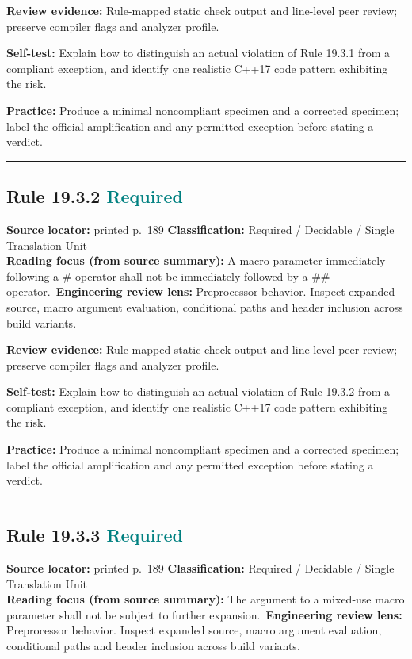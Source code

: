 \documentclass[10pt,letterpaper]{article}
\begin{document}
\textbf{Review evidence:} Rule-mapped static check output and line-level peer review; preserve compiler flags and analyzer profile.

\textbf{Self-test:} Explain how to distinguish an actual violation of Rule 19.3.1 from a compliant exception, and identify one realistic C++17 code pattern exhibiting the risk.\par
\textbf{Practice:} Produce a minimal noncompliant specimen and a corrected specimen; label the official amplification and any permitted exception before stating a verdict.
\smallskip\hrule\smallskip
\subsection*{Rule 19.3.2 \enspace \texorpdfstring{\small\textcolor{teal}{Required}}{Required}}
\noindent\textbf{Source locator:} printed p.~189 \quad\textbf{Classification:} Required / Decidable / Single Translation Unit\\
\textbf{Reading focus (from source summary):} A macro parameter immediately following a \# operator shall not be immediately followed by a \#\# operator.\
\textbf{Engineering review lens:} Preprocessor behavior. Inspect expanded source, macro argument evaluation, conditional paths and header inclusion across build variants.

\textbf{Review evidence:} Rule-mapped static check output and line-level peer review; preserve compiler flags and analyzer profile.

\textbf{Self-test:} Explain how to distinguish an actual violation of Rule 19.3.2 from a compliant exception, and identify one realistic C++17 code pattern exhibiting the risk.\par
\textbf{Practice:} Produce a minimal noncompliant specimen and a corrected specimen; label the official amplification and any permitted exception before stating a verdict.
\smallskip\hrule\smallskip
\subsection*{Rule 19.3.3 \enspace \texorpdfstring{\small\textcolor{teal}{Required}}{Required}}
\noindent\textbf{Source locator:} printed p.~189 \quad\textbf{Classification:} Required / Decidable / Single Translation Unit\\
\textbf{Reading focus (from source summary):} The argument to a mixed-use macro parameter shall not be subject to further expansion.\
\textbf{Engineering review lens:} Preprocessor behavior. Inspect expanded source, macro argument evaluation, conditional paths and header inclusion across build variants.
\end{document}

